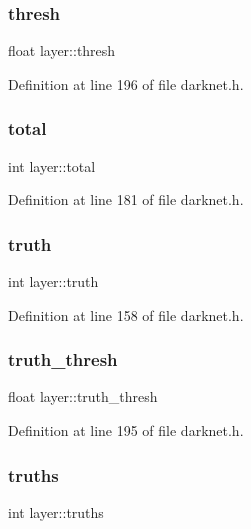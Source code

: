 \subsubsection{\texorpdfstring{thresh}{thresh}}
{\footnotesize\ttfamily float layer\+::thresh}



Definition at line 196 of file darknet.\+h.

\mbox{\label{structlayer_a5899baa591f5d9e897b6af62b0fd13e0}} 
\subsubsection{\texorpdfstring{total}{total}}
{\footnotesize\ttfamily int layer\+::total}



Definition at line 181 of file darknet.\+h.

\mbox{\label{structlayer_ac669e3f8294d93e118977cec91bb792b}} 
\subsubsection{\texorpdfstring{truth}{truth}}
{\footnotesize\ttfamily int layer\+::truth}



Definition at line 158 of file darknet.\+h.

\mbox{\label{structlayer_a53f9de692e18bf39eeaf322afa9612cb}} 
\subsubsection{\texorpdfstring{truth\_thresh}{truth\_thresh}}
{\footnotesize\ttfamily float layer\+::truth\+\_\+thresh}



Definition at line 195 of file darknet.\+h.

\mbox{\label{structlayer_a086d4ebdf69d011ef4c11a487bd5ff60}} 
\subsubsection{\texorpdfstring{truths}{truths}}
{\footnotesize\ttfamily int layer\+::truths}



